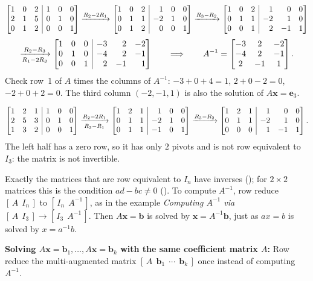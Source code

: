 \documentclass[10pt]{scrartcl}
\makeatletter
\newcommand{\aug}[2]{\left[\begin{array}{@{}#1@{}}#2\end{array}\right]}
\newcommand{\vv}[1]{\mathbf{#1}}
\makeatother
\begin{document}
\begin{example*}
\[
  \aug{rrr|rrr}{1&0&2&1&0&0\\2&1&5&0&1&0\\0&1&2&0&0&1}
  \xrightarrow{R_2-2R_1}
  \aug{rrr|rrr}{1&0&2&1&0&0\\0&1&1&-2&1&0\\0&1&2&0&0&1}
  \xrightarrow{R_3-R_2}
  \aug{rrr|rrr}{1&0&2&1&0&0\\0&1&1&-2&1&0\\0&0&1&2&-1&1}
\]
\[
  \xrightarrow[R_1-2R_3]{R_2-R_3}
  \aug{rrr|rrr}{1&0&0&-3&2&-2\\0&1&0&-4&2&-1\\0&0&1&2&-1&1}
  \qquad\Longrightarrow\qquad
  A^{-1} = \begin{bmatrix} -3 & 2 & -2 \\ -4 & 2 & -1 \\ 2 & -1 & 1 \end{bmatrix}.
\]
Check row~1 of $A$ times the columns of $A^{-1}$: $-3+0+4=1$, $2+0-2=0$, $-2+0+2=0$. The third column $(-2,-1,1)$ is also the solution of $A\vv x=\vv e_3$.
\end{example*}

\begin{example*}
\[
  \aug{rrr|rrr}{1&2&1&1&0&0\\2&5&3&0&1&0\\1&3&2&0&0&1}
  \xrightarrow[R_3-R_1]{R_2-2R_1}
  \aug{rrr|rrr}{1&2&1&1&0&0\\0&1&1&-2&1&0\\0&1&1&-1&0&1}
  \xrightarrow{R_3-R_2}
  \aug{rrr|rrr}{1&2&1&1&0&0\\0&1&1&-2&1&0\\0&0&0&1&-1&1}.
\]
The left half has a zero row, so it has only $2$ pivots and is not row equivalent to $I_3$: the matrix is not invertible.
\end{example*}

\revisit
Exactly the matrices that are row equivalent to $I_n$ have inverses (); for $2\times2$ matrices this is the condition $ad-bc\ne0$ (). To compute $A^{-1}$, row reduce $[\,A\ \ I_n\,]$ to $[\,I_n\ \ A^{-1}\,]$, as in the example \emph{Computing $A^{-1}$ via $[\,A\ \ I_3\,]\to[\,I_3\ \ A^{-1}\,]$}. Then $A\vv x=\vv b$ is solved by $\vv x=A^{-1}\vv b$, just as $ax=b$ is solved by $x=a^{-1}b$.

\begin{shortcuts}
  \ii \textbf{Solving $A\vv x=\vv b_1,\dots,A\vv x=\vv b_k$ with the same coefficient matrix $A$:} Row reduce the multi-augmented matrix $[\,A\ \ \vv b_1\ \ \cdots\ \ \vv b_k\,]$ once instead of computing $A^{-1}$.
\end{shortcuts}
\end{document}
